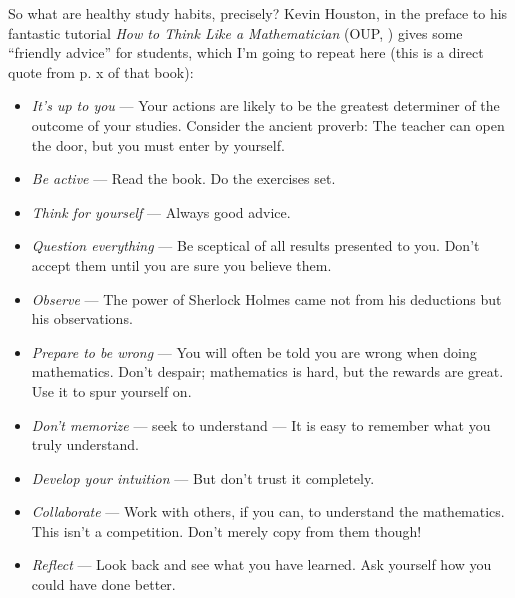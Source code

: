 \documentclass[a4paper,11pt,notitlepage]{uureport}
\begin{document}
So what are healthy study habits, precisely?
Kevin Houston, in the preface to his fantastic tutorial \emph{How to Think Like a Mathematician} (OUP, ) gives some ``friendly advice'' for students,
which I'm going to repeat here (this is a direct quote from p. x of that book):
		\begin{itemize}
		
			\item \emph{It’s up to you} --- Your actions are likely to be the greatest determiner of the outcome of your studies. Consider the ancient proverb: The teacher can open the door, but you must enter by yourself.
			
			\item  \emph{Be active} --- Read the book. Do the exercises set.

			\item  \emph{Think for yourself} --- Always good advice.

			\item  \emph{Question everything} --- Be sceptical of all results presented to you. Don’t accept them until you are sure you believe them.

			\item  \emph{Observe} --- The power of Sherlock Holmes came not from his deductions but his observations.

			\item  \emph{Prepare to be wrong} --- You will often be told you are wrong when doing mathematics. Don’t despair; mathematics is hard, but the rewards are great. Use it to spur yourself on.

			\item  \emph{Don't memorize} --- seek to understand --- It is easy to remember what you truly understand.
			
			\item  \emph{Develop your intuition} --- But don’t trust it completely.

			\item  \emph{Collaborate} --- Work with others, if you can, to understand the mathematics. This isn't a competition. Don’t merely copy from them though!
			
			\item  \emph{Reflect} --- Look back and see what you have learned. Ask yourself how you could have
done better.

		\end{itemize}
\end{document}
